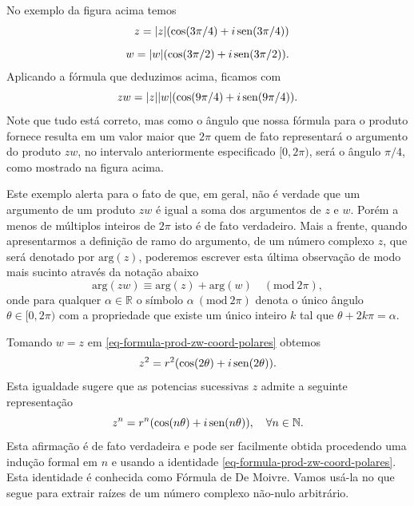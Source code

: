 No exemplo da figura acima temos 
\begin{align*}
z=|z|(\cos(3\pi/4)+i\operatorname{sen}(3\pi/4))
\\[0.2cm]
w=|w|(\cos(3\pi/2)+i\operatorname{sen}(3\pi/2)).
\end{align*}
Aplicando a fórmula que deduzimos acima, ficamos com 
\[
zw=|z||w|(\cos(9\pi/4)+i\operatorname{sen}(9\pi/4)).
\]
Note que tudo está correto, mas como o ângulo que nossa fórmula para o produto fornece resulta em um valor 
maior que $2\pi$ quem de fato representará o argumento do produto $zw$, 
no intervalo anteriormente especificado $[0,2\pi)$, 
será o ângulo $\pi/4$, como mostrado na figura acima.

Este exemplo alerta para o fato de que, em geral, não é verdade que um argumento de um produto $zw$
é igual a soma dos argumentos de $z$ e $w$. Porém a menos de múltiplos inteiros de $2\pi$ isto 
é de fato verdadeiro. Mais a frente, quando apresentarmos a definição de ramo do argumento, 
de um número complexo $z$, que será denotado por $\mathrm{arg}(z)$, 
poderemos escrever esta última observação de modo mais sucinto através da notação abaixo
\[
\mathrm{arg}(zw) \equiv \mathrm{arg}(z)+\mathrm{arg}(w) \quad  (\mathrm{mod}\ 2\pi),
\] 
onde para qualquer $\alpha\in\mathbb{R}$ o símbolo $\alpha\ (\mathrm{mod}\ 2\pi)$
denota o único ângulo $\theta\in [0,2\pi)$ com a propriedade
que existe um único inteiro $k$ tal que $\theta +2k\pi= \alpha$.



Tomando $w=z$ em \eqref{eq-formula-prod-zw-coord-polares} obtemos
\[
z^2 = r^2(\cos(2\theta)+i\operatorname{sen}(2\theta)).
\] 
Esta igualdade sugere que as potencias sucessivas $z$ admite a seguinte representação
\[
z^n = r^n (\cos(n\theta)+i\operatorname{sen}(n\theta)), \quad \forall n\in\mathbb{N}.
\]
Esta afirmação é de fato verdadeira e pode ser facilmente obtida 
procedendo uma indução formal em $n$ e usando a identidade \eqref{eq-formula-prod-zw-coord-polares}.
Esta identidade é conhecida como Fórmula de De Moivre.
Vamos usá-la no que segue para extrair 
raízes de um número complexo não-nulo arbitrário. 


